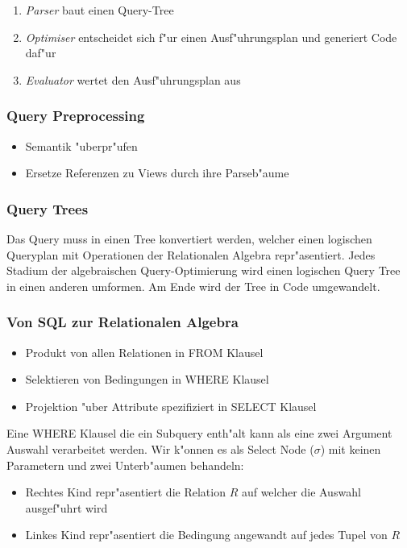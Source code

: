 \documentclass[german, 10pt, a4paper, twocolumn]{scrartcl}
\theoremstyle{definition}
\theoremstyle{remark}
\theoremstyle{example}
\begin{document}
\begin{enumerate}
	\item \textit{Parser} baut einen Query-Tree
	\item \textit{Optimiser} entscheidet sich f"ur einen Ausf"uhrungsplan und generiert Code daf"ur
	\item \textit{Evaluator} wertet den Ausf"uhrungsplan aus
\end{enumerate}

\subsubsection{Query Preprocessing}

\begin{itemize}
	\item Semantik "uberpr"ufen
	\item Ersetze Referenzen zu Views durch ihre Parseb"aume
\end{itemize}

\subsubsection{Query Trees}

Das Query muss in einen Tree konvertiert werden, welcher einen logischen Queryplan mit Operationen der Relationalen Algebra repr"asentiert. Jedes Stadium der algebraischen Query-Optimierung wird einen logischen Query Tree in einen anderen umformen. Am Ende wird der Tree in Code umgewandelt.

\subsubsection{Von SQL zur Relationalen Algebra}

\begin{itemize}
	\item Produkt von allen Relationen in FROM Klausel
	\item Selektieren von Bedingungen in WHERE Klausel
	\item Projektion "uber Attribute spezifiziert in SELECT Klausel
\end{itemize}

Eine WHERE Klausel die ein Subquery enth"alt kann als eine zwei Argument Auswahl verarbeitet werden. Wir k"onnen es als Select Node ($\sigma$) mit keinen Parametern und zwei Unterb"aumen behandeln:
\begin{itemize}
	 \item Rechtes Kind repr"asentiert die Relation $R$ auf welcher die Auswahl ausgef"uhrt wird
	 \item Linkes Kind repr"asentiert die Bedingung angewandt auf jedes Tupel von $R$
\end{itemize}
\end{document}
